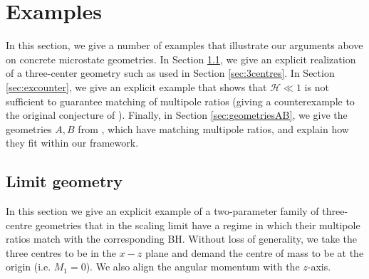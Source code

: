 \documentclass[12pt,a4paper]{article}
\begin{document}
\section{Examples}\label{sec:examples}

In this section, we give a number of examples that illustrate our arguments above on concrete microstate geometries. In Section \ref{sec:limitMG}, we give an explicit realization of a three-center geometry such as used in Section \ref{sec:3centres}. In Section \ref{sec:excounter}, we give an explicit example that shows that $\mathcal{H}\ll 1$ is not sufficient to guarantee matching of multipole ratios (giving a counterexample to the original conjecture of \cite{Bena:2020see,Bena:2020uup}). Finally, in Section \ref{sec:geometriesAB}, we give the geometries $A,B$ from \cite{Bena:2020uup}, which have matching multipole ratios, and explain how they fit within our framework.

\subsection{Limit geometry}\label{sec:limitMG}

In this section we give an explicit example of a two-parameter family of three-centre geometries that in the scaling limit have a regime in which their multipole ratios match with the corresponding BH. Without loss of generality, we take the three centres to be in the $x-z$ plane and demand the centre of mass to be at the origin (i.e. $M_1=0$). We also align the angular momentum with the $z$-axis.
\end{document}
